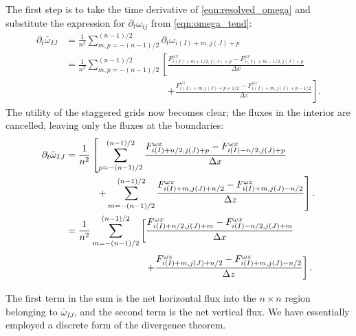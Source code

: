 \documentclass{article}
\begin{document}
The first step is to take the time derivative of \autoref{eqn:resolved_omega}
and substitute the expression for $\partial_t \omega_{ij}$ from
\autoref{eqn:omega_tend}:
\begingroup
\allowdisplaybreaks
\begin{align*}
    \partial_t \bar{\omega}_{IJ}
        &= \frac{1}{n^2} \sum_{m,p=-(n-1)/2}^{(n-1)/2}
            \partial_t \omega_{i(I)+m,j(J)+p} \\
        &= \frac{1}{n^2} \sum_{m,p=-(n-1)/2}^{(n-1)/2} \left[
            \frac{
                F^{\omega x}_{i(I)+m+1/2,j(J)+p}
                - F^{\omega x}_{i(I)+m-1/2,j(J)+p}
            }{\Delta x} \right. \\
        &\phantom{{}=\frac{1}{n^2} \sum_{m,p=-(n-1)/2}^{(n-1)/2} \left[\right.}
            \left. + \frac{
                F^{\omega z}_{i(I)+m,j(J)+p+1/2}
                - F^{\omega z}_{i(I)+m,j(J)+p-1/2}
            }{\Delta z}
            \right].
\end{align*}
\endgroup
The utility of the staggered grids now becomes clear; the fluxes in the
interior are cancelled, leaving only the fluxes at the boundaries:
\begingroup
\allowdisplaybreaks
\begin{align} \allowdisplaybreaks
    \nonumber
    \partial_t \bar{\omega}_{IJ}
    &= \frac{1}{n^2} \left[ \sum_{p=-(n-1)/2}^{(n-1)/2}
        \frac{
            F^{\omega x}_{i(I)+n/2,j(J)+p}
            - F^{\omega x}_{i(I)-n/2,j(J)+p}
        }{\Delta x} \right. \\
    \nonumber
    &\phantom{{}= \frac{1}{n^2} \left[\right.}
        \left. + \sum_{m=-(n-1)/2}^{(n-1)/2} \frac{
            F^{\omega z}_{i(I)+m,j(J)+n/2}
            - F^{\omega z}_{i(I)+m,j(J)-n/2}
        }{\Delta z}
        \right]. \\
    \label{eqn:omegabar_tend}
    &\begin{aligned}
        &= \frac{1}{n^2} \sum_{m=-(n-1)/2}^{(n-1)/2} \left[
            \frac{
                F^{\omega x}_{i(I)+n/2,j(J)+m}
                - F^{\omega x}_{i(I)-n/2,j(J)+m}
            }{\Delta x} \right. \\
        &\phantom{{}=\frac{1}{n^2} \sum_{m=-(n-1)/2}^{(n-1)/2} \left[\right.}
            \left. + \frac{
                F^{\omega z}_{i(I)+m,j(J)+n/2}
                - F^{\omega z}_{i(I)+m,j(J)-n/2}
            }{\Delta z}
            \right].
    \end{aligned}
\end{align}
\endgroup
The first term in the sum is the net horizontal flux into the $n \times n$
region belonging to $\bar{\omega}_{IJ}$, and the second term is the net
vertical flux. We have essentially employed a discrete form of the divergence
theorem.
\end{document}
